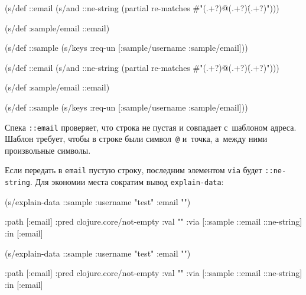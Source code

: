 
\ifx\DEVICETYPE\MOBILE

\begin{english}
  \begin{clojure}
(s/def ::email
  (s/and
    ::ne-string
    (partial re-matches
      #"(.+?)@(.+?)\.(.+?)")))

(s/def :sample/email ::email)

(s/def ::sample
  (s/keys :req-un [:sample/username
                   :sample/email]))
  \end{clojure}
\end{english}

\else

\begin{english}
  \begin{clojure}
(s/def ::email
  (s/and
   ::ne-string
   (partial re-matches #"(.+?)@(.+?)\.(.+?)")))

(s/def :sample/email ::email)

(s/def ::sample
  (s/keys :req-un [:sample/username
                   :sample/email]))
  \end{clojure}
\end{english}

\fi

Спека \verb|::email| проверяет, что строка не пустая и совпадает с~шаблоном
адреса. Шаблон требует, чтобы в строке были символ~\verb|@| и~точка, а~между
ними произвольные символы.

\mnoindent
Если передать в \verb|email| пустую строку, последним элементом \verb|via|
будет \verb|::ne-string|. Для экономии места сократим вывод
\verb|explain-data|:

\ifx\DEVICETYPE\MOBILE

\begin{english}
  \begin{clojure}
(s/explain-data ::sample
  {:username "test" :email ""})

{:path [:email]
 :pred clojure.core/not-empty
 :val ""
 :via [::sample ::email ::ne-string]
 :in [:email]}
  \end{clojure}
\end{english}

\else

\begin{english}
  \begin{clojure}
(s/explain-data ::sample {:username "test" :email ""})

{:path [:email]
 :pred clojure.core/not-empty
 :val ""
 :via [::sample ::email ::ne-string]
 :in [:email]}
  \end{clojure}
\end{english}

